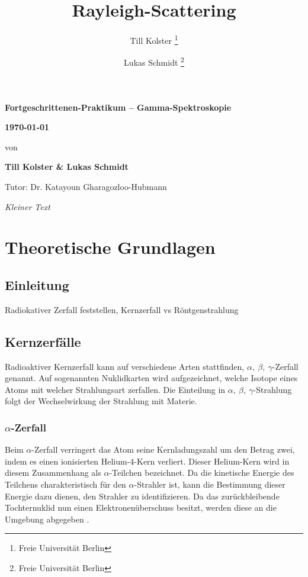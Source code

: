 \documentclass[
	parskip=half,10pt,
	numbers= noenddot, %
	toc=flat, %
	oneside,
	twocolumn,
	]{scrartcl}
\title {Rayleigh-Scattering}
\author {Till Kolster \thanks{Freie Universität Berlin} \and Lukas Schmidt \thanks{Freie Universität Berlin}}
\begin{document}
\begin{titlepage}

\vspace*{-2cm}

\vspace{6cm}
\begin{center}
\huge \bfseries
Fortgeschrittenen-Praktikum -- Gamma-Spektroskopie

\vspace{0.5cm}
\large \bfseries
\today

\vspace{1.5cm}

\large\normalfont von

\bigskip
\textbf{Till Kolster \& Lukas Schmidt}

\bigskip
Tutor: Dr. Katayoun Gharagozloo-Hubmann

\vspace{3cm}

\parbox{0.8\linewidth}{%
\textit{Kleiner Text}}


\end{center}
\end{titlepage}


\section{Theoretische Grundlagen}

\subsection{Einleitung}

Radiokativer Zerfall feststellen, Kernzerfall vs Röntgenstrahlung

\subsection{Kernzerfälle}

Radioaktiver Kernzerfall kann auf verschiedene Arten stattfinden, $\alpha, ~\beta, ~ \gamma$-Zerfall genannt. Auf sogenannten Nuklidkarten wird aufgezeichnet, welche 
Isotope eines Atoms mit welcher Strahlungsart zerfallen. Die Einteilung in $\alpha, ~\beta, ~ \gamma$-Strahlung folgt der Wechselwirkung der Strahlung mit Materie.

\subsubsection{$\alpha$-Zerfall}
Beim $\alpha$-Zerfall verringert das Atom seine Kernladungszahl um den Betrag zwei, indem es einen ionisierten Helium-4-Kern verliert. Dieser Helium-Kern wird in diesem 
Zusammenhang als $\alpha$-Teilchen bezeichnet. Da die kinetische Energie des Teilchens charakteristisch für den $\alpha$-Strahler ist, kann die Bestimmung dieser 
Energie dazu dienen, den Strahler zu identifizieren. Da das zurückbleibende Tochternuklid nun einen Elektronenüberschuss besitzt, werden diese an die Umgebung abgegeben 
\cite{kuckuk}. 
\end{document}
